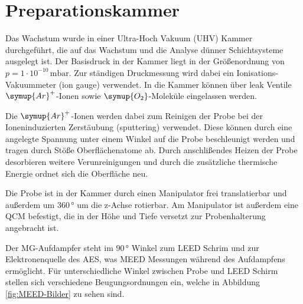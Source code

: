 \chapter{Preparationskammer}

Das Wachstum wurde in einer Ultra-Hoch Vakuum (UHV) Kammer durchgeführt, die auf das Wachstum und die Analyse dünner Schichtsysteme ausgelegt ist.
Der Basisdruck in der Kammer liegt in der Größenordnung von $p=1\cdot 10^{-10}\,\si{\milli\bar}$.
Zur ständigen Druckmessung wird dabei ein Ionisations-Vakuummeter (ion gauge) verwendet.
In die Kammer können über leak Ventile $\symup{Ar}^+$-Ionen sowie $\symup{O_2}$-Moleküle 
eingelassen werden. 

Die $\symup{Ar}^+$-Ionen werden dabei zum Reinigen der Probe bei der Ioneninduzierten Zerstäubung (sputtering) verwendet.
Diese können durch eine angelegte Spannung unter einem Winkel auf die Probe beschleunigt werden und tragen durch Stöße Oberflächenatome ab.
Durch anschlißendes Heizen der Probe desorbieren weitere Verunreinigungen und durch die zusätzliche thermische Energie ordnet sich die 
Oberfläche neu.

Die Probe ist in der Kammer durch einen Manipulator frei translatierbar und außerdem um $360\,\si{\degree}$ um die z-Achse rotierbar.
Am Manipulator ist außerdem eine QCM befestigt, die in der Höhe und  Tiefe versetzt zur Probenhalterung angebracht ist.

Der MG-Aufdampfer steht im $90\,\si{\degree}$ Winkel zum LEED Schrim und zur Elektronenquelle des AES, was MEED Messungen während des Aufdampfens ermöglicht.
Für unterschiedliche Winkel zwischen Probe und LEED Schirm stellen sich verschiedene Beugungsordnungen ein, welche in Abbildung \ref{fig:MEED-Bilder} zu sehen sind.



